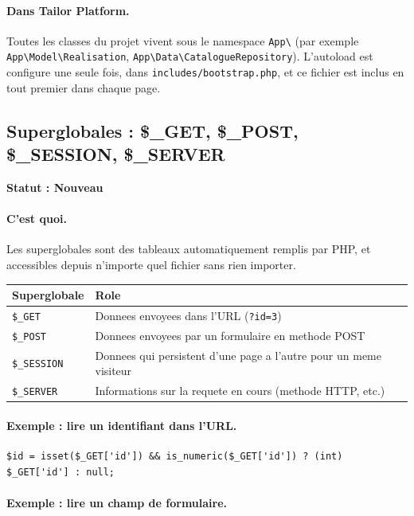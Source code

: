 \documentclass[11pt,a4paper]{article}
\newcommand{\statut}[1]{\textbf{Statut : #1}}
\begin{document}
\paragraph{Dans Tailor Platform.}
Toutes les classes du projet vivent sous le namespace \verb|App\| (par
exemple \verb|App\Model\Realisation|, \verb|App\Data\CatalogueRepository|).
L'autoload est configure une seule fois, dans \verb|includes/bootstrap.php|,
et ce fichier est inclus en tout premier dans chaque page.

\subsection{Superglobales : \$\_GET, \$\_POST, \$\_SESSION, \$\_SERVER}

\statut{Nouveau}

\paragraph{C'est quoi.}
Les superglobales sont des tableaux automatiquement remplis par PHP, et
accessibles depuis n'importe quel fichier sans rien importer.

\begin{longtable}{|p{2.5cm}|p{9.5cm}|}
\hline
\textbf{Superglobale} & \textbf{Role} \\
\hline
\verb|$_GET| & Donnees envoyees dans l'URL (\verb|?id=3|) \\
\hline
\verb|$_POST| & Donnees envoyees par un formulaire en methode POST \\
\hline
\verb|$_SESSION| & Donnees qui persistent d'une page a l'autre pour un meme visiteur \\
\hline
\verb|$_SERVER| & Informations sur la requete en cours (methode HTTP, etc.) \\
\hline
\end{longtable}

\paragraph{Exemple : lire un identifiant dans l'URL.}

\begin{lstlisting}
$id = isset($_GET['id']) && is_numeric($_GET['id']) ? (int) $_GET['id'] : null;
\end{lstlisting}

\paragraph{Exemple : lire un champ de formulaire.}
\end{document}
